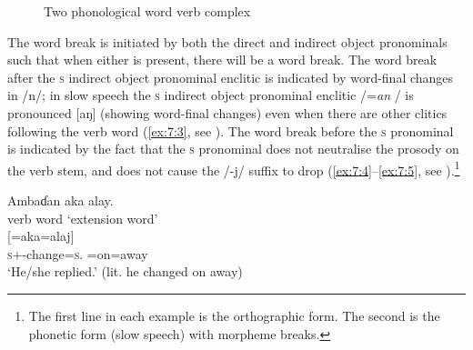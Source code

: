 \begin{figure}
\caption{Two phonological word verb complex\label{fig:7.2}\label{fig:12}}
\end{figure}

The word break is initiated by both the direct and indirect object pronominals such that when either is present, there will be a word break. The word break after the \textsc{s} indirect object pronominal enclitic is indicated by word-final changes in /n/; in slow speech the \textsc{s} indirect object pronominal enclitic /=\textit{an }/ is pronounced [aŋ] (showing word-final changes) even when there are other clitics following the verb word (\ref{ex:7:3}, see ).  The word break before the \textsc{s} \DO pronominal is indicated by the fact that the \textsc{s} \DO pronominal does not neutralise the prosody on the verb stem, and does not cause the  /-j/ suffix to drop (\ref{ex:7:4}--\ref{ex:7:5}, see ).\footnote{The first line in each example is the orthographic form. The second is the phonetic form (slow speech) with morpheme breaks.} 


\ea\label{ex:7:3}
Ambaɗan  aka  alay.\\
verb word   \hspace{50pt}  ‘extension word’\\
\gll [à-mbaɗ=aŋ] \hspace{5pt} [=aka=alaj]\\
\textsc{s}+{\PFV}-change=\textsc{s}.{\IO} \hspace{5pt}  =on=away\\
\glt ‘He/she replied.’ (lit. he changed on away)
\z

